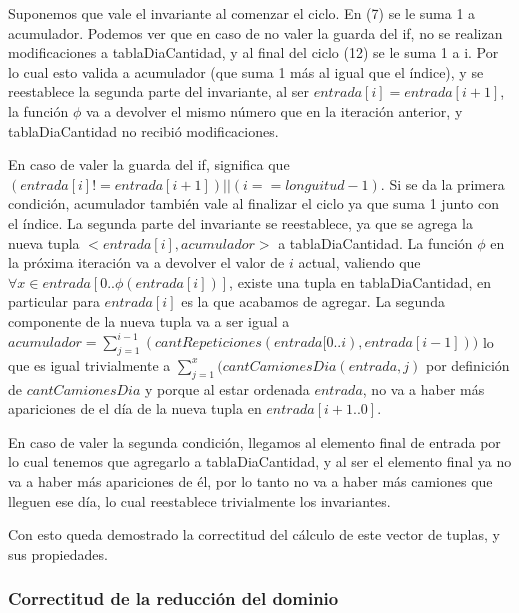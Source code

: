 \vspace{4mm}

Suponemos que vale el invariante al comenzar el ciclo. En (7) se le suma 1 a acumulador. Podemos ver que en caso de no valer la guarda del if, no se realizan modificaciones a tablaDiaCantidad, y al final del ciclo (12) se le suma 1 a i. Por lo cual esto valida a acumulador (que suma 1 m\'as al igual que el \'indice), y se reestablece la segunda parte del invariante, al ser $entrada[i] = entrada[i+1]$, la funci\'on $\phi$ va a devolver el mismo n\'umero que en la iteraci\'on anterior, y tablaDiaCantidad no recibi\'o modificaciones.
\vspace{4mm}

En caso de valer la guarda del if, significa que $(entrada[i] != entrada[i+1]) || (i==longuitud-1)$. Si se da la primera condici\'on, acumulador tambi\'en vale al finalizar el ciclo ya que suma 1 junto con el \'indice. La segunda parte del invariante se reestablece, ya que se agrega la nueva tupla $<entrada[i], acumulador>$ a tablaDiaCantidad. La funci\'on $\phi$ en la pr\'oxima iteraci\'on va a devolver el valor de $i$ actual,  valiendo que $ \forall x \in entrada[0..\phi(entrada[i])]$, existe una tupla en tablaDiaCantidad, en particular para $entrada[i]$ es la que acabamos de agregar. La segunda componente de la nueva tupla va a ser igual a $acumulador = \sum_{j=1}^{i-1}(cantRepeticiones(entrada[0..i), entrada[i-1]))$ lo que es igual trivialmente a $ \sum_{j=1}^{x}(cantCamionesDia(entrada, j)$ por definici\'on de $cantCamionesDia$ y porque al estar ordenada $entrada$, no va a haber m\'as apariciones de el d\'ia de la nueva tupla en $entrada[i+1..0]$.

En caso de valer la segunda condici\'on, llegamos al elemento final de entrada por lo cual tenemos que agregarlo a tablaDiaCantidad, y al ser el elemento final ya no va a haber m\'as apariciones de \'el, por lo tanto no va a haber m\'as camiones que lleguen ese d\'ia, lo cual reestablece trivialmente los invariantes.

\vspace{4mm}

Con esto queda demostrado la correctitud del c\'alculo de este vector de tuplas, y sus propiedades.

\vspace{4mm}

\subsubsection{Correctitud de la reducci\'on del dominio}

